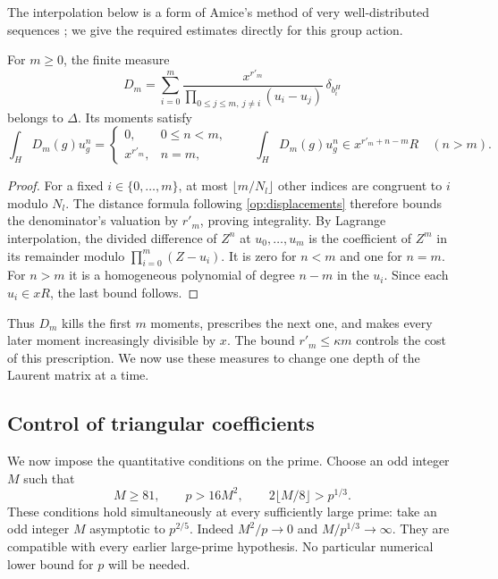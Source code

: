 The interpolation below is a form of Amice's method of very
well-distributed sequences \cite[Sections~2.4 and~6.2]{Amice1964};
we give the required estimates directly for this group action.

\begin{lemma}
\label{op:divided-differences}
For $m\ge0$, the finite measure
\begin{equation}
 D_m=\sum_{i=0}^m
 \frac{x^{r'_m}}{\prod_{0\le j\le m,\ j\ne i}(u_i-u_j)}
 \,\delta_{b_i^H}
 \label{op:measure}
\end{equation}
belongs to $\Delta$. Its moments satisfy
\[
 \int_H D_m(g)u_g^n=
 \begin{cases}
 0,&0\le n<m,\\
 x^{r'_m},&n=m,
 \end{cases}
 \qquad
 \int_H D_m(g)u_g^n\in x^{r'_m+n-m}R\quad(n>m).
\]
\end{lemma}

\begin{proof}
For a fixed $i\in\{0,\ldots,m\}$, at most $\lfloor m/N_l\rfloor$
other indices are congruent to $i$ modulo $N_l$. The distance formula
following \eqref{op:displacements} therefore bounds the denominator's
valuation by $r'_m$, proving integrality. By Lagrange interpolation,
the divided difference of $Z^n$ at $u_0,\ldots,u_m$ is the coefficient
of $Z^m$ in its remainder modulo $\prod_{i=0}^m(Z-u_i)$. It is zero for
$n<m$ and one for $n=m$. For $n>m$ it is a homogeneous polynomial of
degree $n-m$ in the $u_i$. Since each $u_i\in xR$, the last bound follows.
\end{proof}

Thus $D_m$ kills the first $m$ moments, prescribes the next one, and
makes every later moment increasingly divisible by $x$. The bound
$r'_m\le\kappa m$ controls the cost of this prescription. We now use
these measures to change one depth of the Laurent matrix at a time.

\subsection{Control of triangular coefficients}

We now impose the quantitative conditions on the prime. Choose an odd
integer $M$ such that
\begin{equation}
 M\ge81,\qquad p>16M^2,\qquad
 2\lfloor M/8\rfloor>p^{1/3}.
 \label{op:parameters}
\end{equation}
These conditions hold simultaneously at every sufficiently large prime:
take an odd integer $M$ asymptotic to $p^{2/5}$. Indeed
$M^2/p\longrightarrow0$ and $M/p^{1/3}\longrightarrow\infty$.
They are compatible with every earlier large-prime hypothesis. No
particular numerical lower bound for $p$ will be needed.

